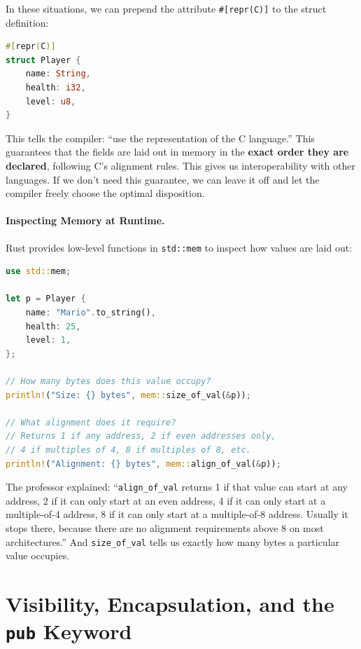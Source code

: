 In these situations, we can prepend the attribute \texttt{\#[repr(C)]} to the struct definition:

\begin{lstlisting}[language=Rust]
#[repr(C)]
struct Player {
    name: String,
    health: i32,
    level: u8,
}
\end{lstlisting}

This tells the compiler: ``use the representation of the C language.'' This guarantees that the fields are laid out in memory in the \textbf{exact order they are declared}, following C's alignment rules. This gives us interoperability with other languages. If we don't need this guarantee, we can leave it off and let the compiler freely choose the optimal disposition.

\paragraph{Inspecting Memory at Runtime.} Rust provides low-level functions in \texttt{std::mem} to inspect how values are laid out:

\begin{lstlisting}[language=Rust]
use std::mem;

let p = Player {
    name: "Mario".to_string(),
    health: 25,
    level: 1,
};

// How many bytes does this value occupy?
println!("Size: {} bytes", mem::size_of_val(&p));

// What alignment does it require?
// Returns 1 if any address, 2 if even addresses only,
// 4 if multiples of 4, 8 if multiples of 8, etc.
println!("Alignment: {} bytes", mem::align_of_val(&p));
\end{lstlisting}

The professor explained: ``\texttt{align\_of\_val} returns 1 if that value can start at any address, 2 if it can only start at an even address, 4 if it can only start at a multiple-of-4 address, 8 if it can only start at a multiple-of-8 address. Usually it stops there, because there are no alignment requirements above 8 on most architectures.'' And \texttt{size\_of\_val} tells us exactly how many bytes a particular value occupies.

\section{Visibility, Encapsulation, and the \texttt{pub} Keyword}

